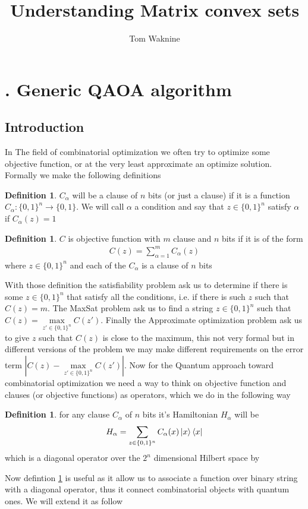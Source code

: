 \documentclass[12pt]{amsart}
\numberwithin{equation}{section}
\theoremstyle{definition}
\newtheorem{definition}[theorem]{Definition}
\begin{document}
\title{Understanding Matrix convex sets}
\author{Tom Waknine}

\maketitle


\section{. Generic QAOA algorithm }
\subsection{ Introduction}
In The field of combinatorial optimization we often try to optimize some objective function, or at the very least approximate an optimize solution. Formally we make the following  definitions 
\begin{definition}\label{def:1.1}
$C_\alpha$ will be a clause of $n$ bits (or just a clause) if it is a function $C_\alpha:\{0,1\}^n\to\{0,1\}$. We will call $\alpha$ a condition and say that $z\in \{0,1\}^n$ satisfy $\alpha$ if $C_\alpha(z)=1$
\end{definition}

\begin{definition}\label{def:1.2}
$C$ is objective function with $m$ clause and $n$ bits if it is of the form \begin{align*}
    C(z)=\sum_{\alpha=1}^m C_\alpha (z)
\end{align*}
where $z\in \{0,1\}^n$ and each of the $C_\alpha$ is a  clause of $n$ bits 
\end{definition} 
With those definition the satisfiability problem ask us to determine if there is some $z\in \{0,1\}^n$ that satisfy all the conditions, i.e. if there is such $z$ such that $C(z)=m$.  The MaxSat problem ask us to find a string $z\in \{0,1\}^n$ such that $C(z)=\max\limits_{z'\in \{0,1\}^n}C(z')$. Finally the Approximate optimization problem ask us to give $z$ such that $C(z)$ is close to the maximum, this not very formal but in different versions of the problem we may make different requirements on the error term $|C(z)-\max\limits_{z'\in \{0,1\}^n}C(z')|$. Now for the Quantum approach toward  combinatorial optimization we need a way to think on objective function and clauses (or objective functions) as operators, which we do in the following way \begin{definition}\label{def:1.3}
for any clause $C_\alpha$ of $n$ bits it's Hamiltonian $H_\alpha$ will be  
\begin{align*}
    H_\alpha=\sum_{z\in\{0,1\}^n}C_\alpha(x)\ket{x}\bra{x}
\end{align*}
which is a diagonal operator  over the $2^n$ dimensional Hilbert space by
\end{definition}
Now defintion \ref{def:1.3} is useful as it allow us to associate  a function over binary string with a diagonal operator, thus it connect combinatorial objects with quantum ones. We will extend it as follow  
\end{document}

